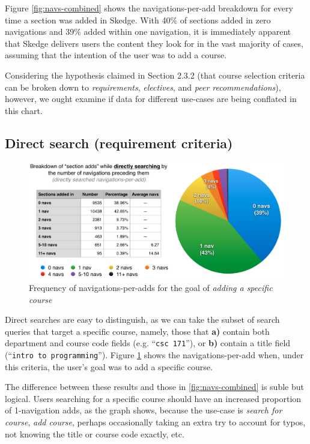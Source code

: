 Figure \ref{fig:navs-combined} shows the navigations-per-add breakdown for every time a section was added in Skedge. With 40\% of sections added in zero navigations and 39\% added within one navigation, it is immediately apparent that Skedge delivers users the content they look for in the vast majority of cases, assuming that the intention of the user was to add a course.

Considering the hypothesis claimed in Section 2.3.2 (that course selection criteria can be broken down to \emph{requirements}, \emph{electives}, and \emph{peer recommendations}), however, we ought examine if data for different use-cases are being conflated in this chart.

\subsection{Direct search (requirement criteria)}

  \begin{figure}
    \centering
    \includegraphics[width=1.0\textwidth]{images/graph/direct_navs}

    \caption{Frequency of navigations-per-adds for the goal of \emph{adding a specific course}}
    \label{fig:navs-direct}
  \end{figure}

  Direct searches are easy to distinguish, as we can take the subset of search queries that target a specific course, namely, those that \textbf{a)} contain both department and course code fields (e.g. ``{\tt csc 171}''), or \textbf{b)} contain a title field (``{\tt intro to programming}''). Figure \ref{fig:navs-direct} shows the navigations-per-add when, under this criteria, the user's goal was to add a specific course.

  The difference between these results and those in \ref{fig:navs-combined} is suble but logical. Users searching for a specific course should have an increased proportion of 1-navigation adds, as the graph shows, because the use-case is \emph{search for course}, \emph{add course}, perhaps occasionally taking an extra try to account for typos, not knowing the title or course code exactly, etc.

